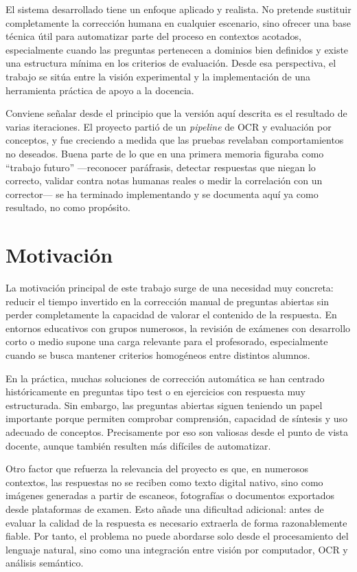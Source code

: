 El sistema desarrollado tiene un enfoque aplicado y realista. No pretende sustituir completamente la corrección humana en cualquier escenario, sino ofrecer una base técnica útil para automatizar parte del proceso en contextos acotados, especialmente cuando las preguntas pertenecen a dominios bien definidos y existe una estructura mínima en los criterios de evaluación. Desde esa perspectiva, el trabajo se sitúa entre la visión experimental y la implementación de una herramienta práctica de apoyo a la docencia.

Conviene señalar desde el principio que la versión aquí descrita es el resultado de varias iteraciones. El proyecto partió de un \emph{pipeline} de OCR y evaluación por conceptos, y fue creciendo a medida que las pruebas revelaban comportamientos no deseados. Buena parte de lo que en una primera memoria figuraba como ``trabajo futuro'' —reconocer paráfrasis, detectar respuestas que niegan lo correcto, validar contra notas humanas reales o medir la correlación con un corrector— se ha terminado implementando y se documenta aquí ya como resultado, no como propósito.

\section{Motivación}

La motivación principal de este trabajo surge de una necesidad muy concreta: reducir el tiempo invertido en la corrección manual de preguntas abiertas sin perder completamente la capacidad de valorar el contenido de la respuesta. En entornos educativos con grupos numerosos, la revisión de exámenes con desarrollo corto o medio supone una carga relevante para el profesorado, especialmente cuando se busca mantener criterios homogéneos entre distintos alumnos.

En la práctica, muchas soluciones de corrección automática se han centrado históricamente en preguntas tipo test o en ejercicios con respuesta muy estructurada. Sin embargo, las preguntas abiertas siguen teniendo un papel importante porque permiten comprobar comprensión, capacidad de síntesis y uso adecuado de conceptos. Precisamente por eso son valiosas desde el punto de vista docente, aunque también resulten más difíciles de automatizar.

Otro factor que refuerza la relevancia del proyecto es que, en numerosos contextos, las respuestas no se reciben como texto digital nativo, sino como imágenes generadas a partir de escaneos, fotografías o documentos exportados desde plataformas de examen. Esto añade una dificultad adicional: antes de evaluar la calidad de la respuesta es necesario extraerla de forma razonablemente fiable. Por tanto, el problema no puede abordarse solo desde el procesamiento del lenguaje natural, sino como una integración entre visión por computador, OCR y análisis semántico.

